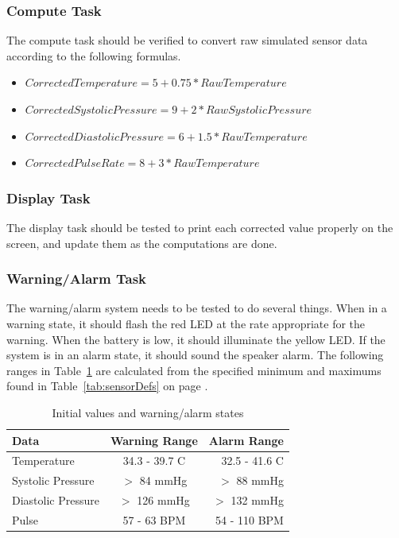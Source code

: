 \documentclass[12pt]{article} %
\begin{document}
\subsubsection{Compute Task}
The compute task should be verified to convert raw simulated sensor data according to the following formulas.
\begin{itemize}
  \item $CorrectedTemperature = 5 + 0.75 * RawTemperature$
  \item $CorrectedSystolicPressure = 9 + 2 * RawSystolicPressure$
  \item $CorrectedDiastolicPressure = 6 + 1.5 * RawTemperature$
  \item $CorrectedPulseRate = 8 + 3 * RawTemperature$
\end{itemize}

\subsubsection{Display Task}
The display task should be tested to print each corrected value properly on the screen, and update them as the computations are done.

\subsubsection{Warning/Alarm Task} 
The warning/alarm system needs to be tested to do several things.  When in a
warning state, it should flash the red LED at the rate appropriate for the
warning.  When the battery is low, it should illuminate the yellow LED.  If the
system is in an alarm state, it should sound the speaker alarm.  The following
ranges in Table~\ref{tab:ranges} are calculated from the specified minimum and
maximums found in Table~\ref{tab:sensorDefs} on page \pageref{tab:sensorDefs}.
\begin{table}[h]
	\centering
	\begin{tabular}{lcr} 
    \toprule
		Data & Warning Range & Alarm Range \\
		\midrule
		Temperature & 34.3 - 39.7 C & 32.5 - 41.6 C\\
		Systolic Pressure  & $>$ 84 mmHg & $>$ 88 mmHg\\
		Diastolic Pressure & $>$ 126 mmHg & $>$ 132 mmHg\\
		Pulse & 57 - 63 BPM & 54 - 110 BPM \\
    \bottomrule
	\end{tabular}
	\caption{Initial values and warning/alarm states}
  \label{tab:ranges}
\end{table}
\end{document}
